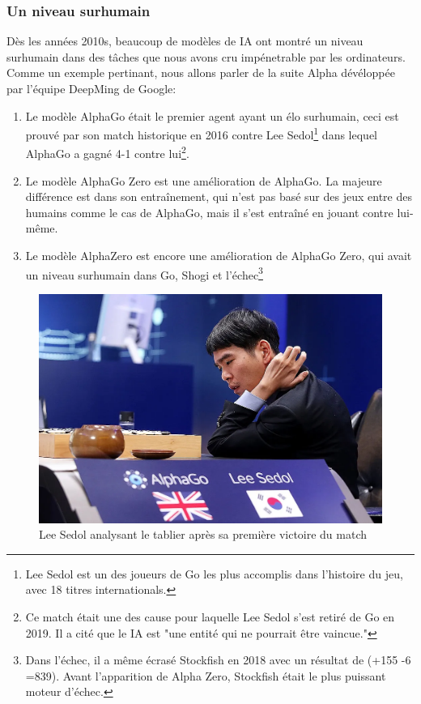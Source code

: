 \subsubsection{Un niveau surhumain}
Dès les années 2010s, beaucoup de modèles de IA ont montré un niveau surhumain dans des tâches que nous avons cru impénetrable par les ordinateurs.
\newline Comme un exemple pertinant, nous allons parler de la suite Alpha dévéloppée par l'équipe DeepMing de Google:
\begin{enumerate}
	\item Le modèle AlphaGo était le premier agent ayant un élo surhumain, ceci est prouvé par son match historique en 2016 contre Lee Sedol\footnote{Lee Sedol est un des joueurs de Go les plus accomplis dans l'histoire du jeu, avec 18 titres internationals. } dans lequel AlphaGo a gagné 4-1 contre lui\footnote{Ce match était une des cause pour laquelle Lee Sedol s'est retiré de Go en 2019. Il a cité que le IA est "une entité qui ne pourrait être vaincue."}.
	\item Le modèle AlphaGo Zero est une amélioration de AlphaGo. La majeure différence est dans son entraînement, qui n'est pas basé sur des jeux entre des humains comme le cas de AlphaGo, mais il s'est entraîné en jouant contre lui-même.
	\item Le modèle AlphaZero est encore une amélioration de AlphaGo Zero, qui avait un niveau surhumain dans Go, Shogi et l'échec\footnote{Dans l'échec, il a même écrasé Stockfish en 2018 avec un résultat de (+155 -6 =839). Avant l'apparition de Alpha Zero, Stockfish était le plus puissant moteur d'échec.}
\end{enumerate}
\begin{figure}[h!]
	\centering
	\includegraphics[width=.7\textwidth]{Figures/go-lee-sedol.png}
	\caption{Lee Sedol analysant le tablier après sa première victoire du match}
	\label{fig:LeeSedolVsAlphaGo}
\end{figure}
\FloatBarrier
